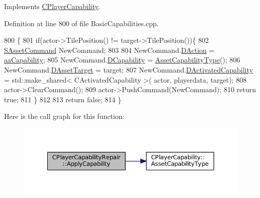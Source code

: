 Implements \hyperlink{classCPlayerCapability_a2ca6fd7fbd9c0178f1cf1d049c63825f}{C\+Player\+Capability}.



Definition at line 800 of file Basic\+Capabilities.\+cpp.


\begin{DoxyCode}
800                                                                                                            
                                                          \{
801     \textcolor{keywordflow}{if}(actor->TilePosition() != target->TilePosition())\{
802         \hyperlink{structSAssetCommand}{SAssetCommand} NewCommand;
803         
804         NewCommand.\hyperlink{structSAssetCommand_a8edd3b3d59a76d5514ba403bc8076a75}{DAction} = \hyperlink{GameDataTypes_8h_ab47668e651a3032cfb9c40ea2d60d670acf9fb164e8abd71c71f4a8c7fda360d4}{aaCapability};
805         NewCommand.\hyperlink{structSAssetCommand_a734ea7c6847457b437360f333f570ff9}{DCapability} = \hyperlink{classCPlayerCapability_a433bb196cd6ab6a932f1cac102b3aa98}{AssetCapabilityType}();
806         NewCommand.\hyperlink{structSAssetCommand_a3d9b43f6e59c386c48c41a65448a0c39}{DAssetTarget} = target;
807         NewCommand.\hyperlink{structSAssetCommand_ad8beda19520811cc70fe1eab16c774dd}{DActivatedCapability} = std::make\_shared< CActivatedCapability >(
      actor, playerdata, target);
808         actor->ClearCommand();
809         actor->PushCommand(NewCommand);
810         \textcolor{keywordflow}{return} \textcolor{keyword}{true};
811     \}
812 
813     \textcolor{keywordflow}{return} \textcolor{keyword}{false};
814 \}
\end{DoxyCode}
Here is the call graph for this function\+:
\nopagebreak
\begin{figure}[H]
\begin{center}
\leavevmode
\includegraphics[width=350pt]{classCPlayerCapabilityRepair_ab4e8da6f225b4bfb7023d75749454ff1_cgraph}
\end{center}
\end{figure}
\hypertarget{classCPlayerCapabilityRepair_ae989c67c5e14bbba5b2ddda993ee635a}{}\label{classCPlayerCapabilityRepair_ae989c67c5e14bbba5b2ddda993ee635a} 
